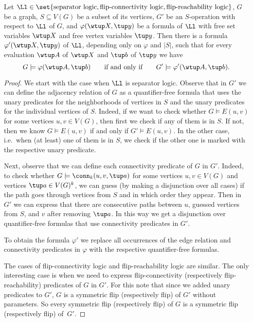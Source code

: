 \begin{lemma}
    \label{lem:operation-forawrd}
    Let $\Ll \in \set{\text{separator logic}, \text{flip-connectivity logic}, \text{flip-reachability logic}}$, $G$ be a graph, $S \subseteq V(G)$ be a subset of its vertices, $G'$ be an $S$-operation with respect to $\Ll$ of $G$, and $\varphi(\wtup X, \tup y)$ be a formula of $\Ll$ with free set variables $\wtup X$ and free vertex variables $\tup y$. Then there is a formula $\varphi'(\wtup X, \tup y)$ of $\Ll$, depending only on $\varphi$ and $|S|$, such that for every evaluation $\wtup A$ of $\wtup X$ and $\tup b$ of $\tup y$ we have
    \[
        G \models \varphi(\wtup A, \tup b) \qquad\textrm{if and only if}\qquad G' \models \varphi'(\wtup A, \tup b).
    \]
\end{lemma}
\begin{proof}
    We start with the case when $\Ll$ is separator logic.
    Observe that in $G'$ we can define the adjacency relation of $G$ as a quantifier-free formula that uses the unary predicates for the neighborhoods of vertices in $S$ and the unary predicates for the individual vertices of $S$.
    Indeed, if we want to check whether $G \models E(u, v)$ for some vertices $u, v \in V(G)$, then first we check if any of them is in $S$.
    If not, then we know $G \models E(u, v)$ if and only if $G' \models E(u, v)$.
    In the other case, i.e.\ when (at least) one of them is in $S$, we check if the other one is marked with the respective unary predicate.

    Next, observe that we can define each connectivity predicate of $G$ in $G'$.
    Indeed, to check whether $G \models \conn_k(u, v, \tup a)$ for some vertices $u, v \in V(G)$ and vertices $\tup a \in V(G)^k$, we can guess (by making a disjunction over all cases) if the path goes through vertices from $S$ and in which order they appear.
    Then in $G'$ we can express that there are consecutive paths between $u$, guessed vertices from $S$, and $v$ after removing $\tup a$.
    In this way we get a disjunction over quantifier-free formulas that use connectivity predicates in $G'$.

    To obtain the formula $\varphi'$ we replace all occurrences of the edge relation and connectivity predicates in $\varphi$ with the respective quantifier-free formulas.

    The cases of flip-connectivity logic and flip-reachability logic are similar.
    The only interesting case is when we need to express flip-connectivity (respectively flip-reachability) predicates of $G$ in $G'$.
    For this note that since we added unary predicates to $G'$, $G$ is a symmetric flip (respectively flip) of $G'$ without parameters.
    So every symmetric flip (respectively flip) of $G$ is a symmetric flip (respectively flip) of~$G'$.
\end{proof}


